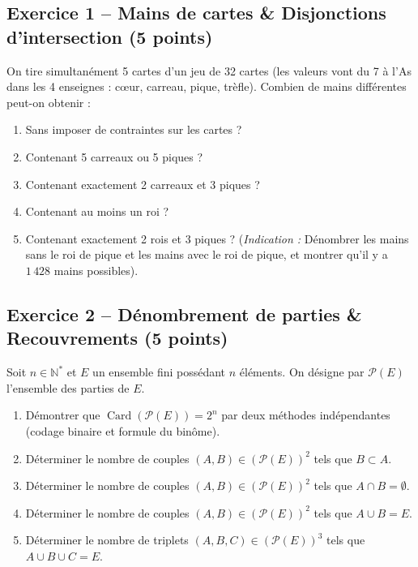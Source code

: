 \documentclass[11pt,a4paper]{article}
\newcommand{\N}{\mathbb{N}}
\begin{document}
\vspace{0.2cm}

\subsection*{Exercice 1 -- Mains de cartes \& Disjonctions d'intersection \hfill (5 points)}

On tire simultanément 5 cartes d'un jeu de 32 cartes (les valeurs vont du 7 à l'As dans les 4 enseignes : cœur, carreau, pique, trèfle).
Combien de mains différentes peut-on obtenir :
\begin{enumerate}
    \item Sans imposer de contraintes sur les cartes ?
    \item Contenant 5 carreaux ou 5 piques ?
    \item Contenant exactement 2 carreaux et 3 piques ?
    \item Contenant au moins un roi ?
    \item Contenant exactement 2 rois et 3 piques ? (\emph{Indication :} Dénombrer les mains sans le roi de pique et les mains avec le roi de pique, et montrer qu'il y a $1\,428$ mains possibles).
\end{enumerate}

\vspace{0.3cm}

\subsection*{Exercice 2 -- Dénombrement de parties \& Recouvrements \hfill (5 points)}

Soit $n \in \N^*$ et $E$ un ensemble fini possédant $n$ éléments. On désigne par $\mathscr{P}(E)$ l'ensemble des parties de $E$.
\begin{enumerate}
    \item Démontrer que $\operatorname{Card}(\mathscr{P}(E)) = 2^n$ par deux méthodes indépendantes (codage binaire et formule du binôme).
    \item Déterminer le nombre de couples $(A, B) \in (\mathscr{P}(E))^2$ tels que $B \subset A$.
    \item Déterminer le nombre de couples $(A, B) \in (\mathscr{P}(E))^2$ tels que $A \cap B = \emptyset$.
    \item Déterminer le nombre de couples $(A, B) \in (\mathscr{P}(E))^2$ tels que $A \cup B = E$.
    \item Déterminer le nombre de triplets $(A, B, C) \in (\mathscr{P}(E))^3$ tels que $A \cup B \cup C = E$.
\end{enumerate}
\end{document}
